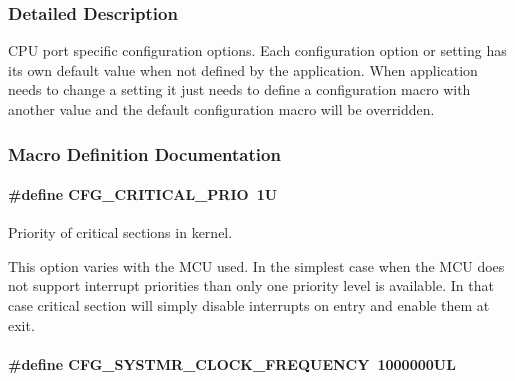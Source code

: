 \subsubsection{Detailed Description}
C\-P\-U port specific configuration options. Each configuration option or setting has its own default value when not defined by the application. When application needs to change a setting it just needs to define a configuration macro with another value and the default configuration macro will be overridden. 

\subsubsection{Macro Definition Documentation}
\hypertarget{group__template__cpu__cfg_gab2277007c357c09ba619a5e2f9b00bd9}{
\paragraph[{C\-F\-G\-\_\-\-C\-R\-I\-T\-I\-C\-A\-L\-\_\-\-P\-R\-I\-O}]{\setlength{\rightskip}{0pt plus 5cm}\#define C\-F\-G\-\_\-\-C\-R\-I\-T\-I\-C\-A\-L\-\_\-\-P\-R\-I\-O~1\-U}}\label{group__template__cpu__cfg_gab2277007c357c09ba619a5e2f9b00bd9}


Priority of critical sections in kernel. 

This option varies with the M\-C\-U used. In the simplest case when the M\-C\-U does not support interrupt priorities than only one priority level is available. In that case critical section will simply disable interrupts on entry and enable them at exit. \hypertarget{group__template__cpu__cfg_gac85c592962ba2c968d13f867533196a1}{
\paragraph[{C\-F\-G\-\_\-\-S\-Y\-S\-T\-M\-R\-\_\-\-C\-L\-O\-C\-K\-\_\-\-F\-R\-E\-Q\-U\-E\-N\-C\-Y}]{\setlength{\rightskip}{0pt plus 5cm}\#define C\-F\-G\-\_\-\-S\-Y\-S\-T\-M\-R\-\_\-\-C\-L\-O\-C\-K\-\_\-\-F\-R\-E\-Q\-U\-E\-N\-C\-Y~1000000\-U\-L}}\label{group__template__cpu__cfg_gac85c592962ba2c968d13f867533196a1}


